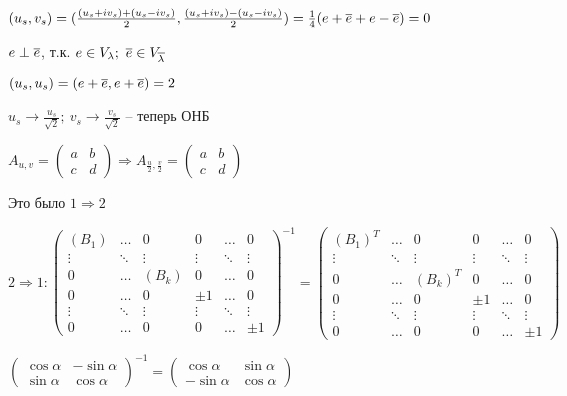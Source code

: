 \documentclass[12pt]{article}
\begin{document}
\begin{enumerate}
    $(u_s, v_s) = (\frac{(u_s + iv_s) + (u_s - iv_s)}{2}, \frac{(u_s + iv_s) - (u_s - iv_s)}{2}) = \frac{1}{4}(e + \overline{e} + e - \overline{e}) = 0$

    $e \perp \overline{e}$, т.к. $e \in V_\lambda;\ \overline{e} \in V_{\overline{\lambda}}$

    $(u_s, u_s) = (e + \overline{e}, e + \overline{e}) = 2$

    $u_s \to \frac{u_s}{\sqrt{2}};\ v_s \to \frac{v_s}{\sqrt{2}}$ -- теперь ОНБ

    $A_{u, v} = \begin{pmatrix}
        a & b \\
        c & d 
    \end{pmatrix} \Rightarrow A_{\frac{u}{2}, \frac{v}{2}} = \begin{pmatrix}
        a & b \\
        c & d 
    \end{pmatrix}$

    Это было $1 \Rightarrow 2$

    $2 \Rightarrow 1 : \begin{pmatrix}
        (B_1) & \ldots & 0 & 0 & \ldots & 0 \\
        \vdots & \ddots & \vdots & \vdots & \ddots & \vdots \\
        0 & \ldots & (B_k) & 0 & \ldots & 0 \\
        0 & \ldots & 0 & \pm 1 & \ldots & 0 \\
        \vdots & \ddots & \vdots & \vdots & \ddots & \vdots \\
        0 & \ldots & 0 & 0 & \ldots & \pm 1
    \end{pmatrix}^{-1} = \begin{pmatrix}
        (B_1)^T & \ldots & 0 & 0 & \ldots & 0 \\
        \vdots & \ddots & \vdots & \vdots & \ddots & \vdots \\
        0 & \ldots & (B_k)^T & 0 & \ldots & 0 \\
        0 & \ldots & 0 & \pm 1 & \ldots & 0 \\
        \vdots & \ddots & \vdots & \vdots & \ddots & \vdots \\
        0 & \ldots & 0 & 0 & \ldots & \pm 1
    \end{pmatrix}$

    $\begin{pmatrix}
        \cos \alpha & - \sin \alpha \\
        \sin \alpha & \cos \alpha
    \end{pmatrix}^{-1} = \begin{pmatrix}
        \cos \alpha & \sin \alpha \\
        -\sin \alpha & \cos \alpha
    \end{pmatrix}$
\end{enumerate}
\end{document}
